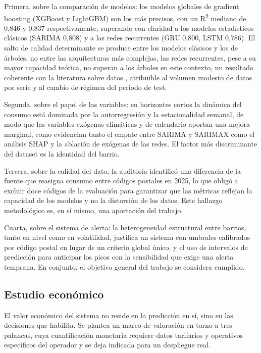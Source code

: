 \documentclass[12pt, a4paper]{article}
\begin{document}
Primera, sobre la comparación de modelos: los modelos globales de gradient boosting (XGBoost y LightGBM) son los más precisos, con un R\textsuperscript{2} mediano de 0,846 y 0,837 respectivamente, superando con claridad a los modelos estadísticos clásicos (SARIMA 0,808) y a las redes recurrentes (GRU 0,800, LSTM 0,786). El salto de calidad determinante se produce entre los modelos clásicos y los de árboles, no entre las arquitecturas más complejas, las redes recurrentes, pese a su mayor capacidad teórica, no superan a los árboles en este contexto, un resultado coherente con la literatura sobre datos , atribuible al volumen modesto de datos por serie y al cambio de régimen del periodo de test.

Segunda, sobre el papel de las variables: en horizontes cortos la dinámica del consumo está dominada por la autorregresión y la estacionalidad semanal, de modo que las variables exógenas climáticas y de calendario aportan una mejora marginal, como evidencian tanto el empate entre SARIMA y SARIMAX como el análisis SHAP y la ablación de exógenas de las redes. El factor más discriminante del dataset es la identidad del barrio.

Tercera, sobre la calidad del dato, la auditoría identificó una diferencia de la fuente que reasigna consumo entre códigos postales en 2025, lo que obligó a excluir doce códigos de la evaluación para garantizar que las métricas reflejan la capacidad de los modelos y no la distorsión de los datos. Este hallazgo metodológico es, en sí mismo, una aportación del trabajo.

Cuarta, sobre el sistema de alerta: la heterogeneidad estructural entre barrios, tanto en nivel como en volatilidad, justifica un sistema con umbrales calibrados por código postal en lugar de un criterio global único, y el uso de intervalos de predicción para anticipar los picos con la sensibilidad que exige una alerta temprana. En conjunto, el objetivo general del trabajo se considera cumplido.

\subsection{Estudio económico}

El valor económico del sistema no reside en la predicción en sí, sino en las decisiones que habilita. Se plantea un marco de valoración en torno a tres palancas, cuya cuantificación monetaria requiere datos tarifarios y operativos específicos del operador y se deja indicada para un despliegue real.
\end{document}
